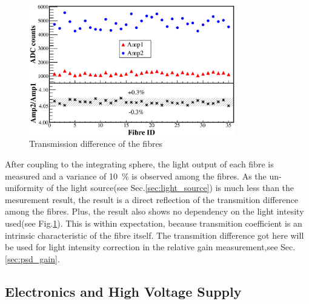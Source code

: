 \documentclass[5p, times]{elsarticle}
\begin{document}
\begin{figure}[h!]
 \centering
 \includegraphics[width=90mm]{fibre_diff}
\caption{Transmission difference of the fibres}
\label{fig:fibre_diff}
\end{figure} 

After coupling to the integrating sphere, the light output of each fibre is measured and a variance of \SI{10}{\percent} is observed among the fibres. 
As the un-uniformity of the light source(see Sec.\ref{sec:light_source}) is much less than the mesurement result, the result is a direct reflection of the transmition difference among the fibres.
Plus, the result also shows no dependency on the light intesity used(see Fig.\ref{fig:fibre_diff}). 
This is within expectation, because transmition coefficient is an intrinsic characteristic of the fibre itself.
The transmition difference got here will be used for light intensity correction in the relative gain measurement,see Sec.\ref{sec:psd_gain}.


\subsection{Electronics and High Voltage Supply}
\label{sec:electronics}

\end{document}
